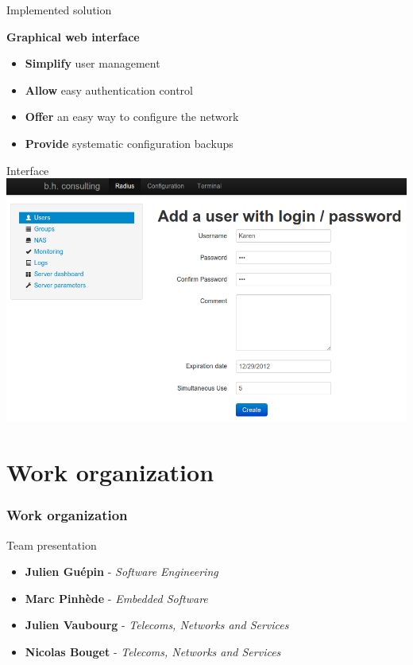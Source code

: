 \documentclass[12pt]{beamer}
\begin{document}
\begin{frame}{Implemented solution}
    \begin{center}
    \textbf{Graphical web interface}
    \end{center}

    \pause
    \begin{itemize}[<+->]\vfill
	\item \textbf{Simplify} user management\vfill
	\item \textbf{Allow} easy authentication control\vfill
	\item \textbf{Offer} an easy way to configure the network\vfill
    	\item \textbf{Provide} systematic configuration backups\vfill
    \end{itemize}
    \vfill
\end{frame}
	
\begin{frame}{Interface}
    \includegraphics[width=\textwidth]{img/capture4.png}
\end{frame}

\part{Work organization}
\frame{\partpage}
\section{Work organization}

\begin{frame}{Team presentation}
    \begin{itemize}[<+->]
	\item {\bf Julien Guépin} - \emph{Software Engineering}
	\vfill
	\item {\bf Marc Pinhède} - \emph{Embedded Software}
	\vfill
	\item {\bf Julien Vaubourg} - \emph{Telecoms, Networks and Services}
	\vfill
	\item {\bf Nicolas Bouget} - \emph{Telecoms, Networks and Services}
    \end{itemize}
\end{frame}
\end{document}
